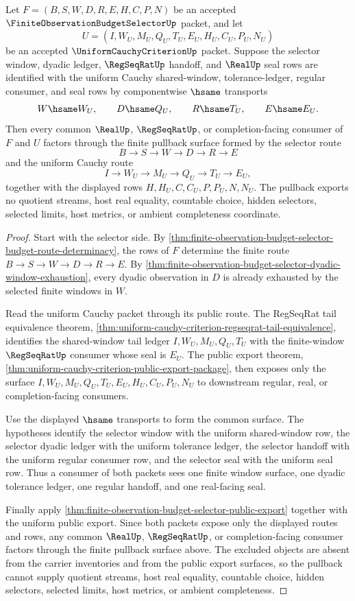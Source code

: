 \begin{theorem}
\label{thm:finite-observation-budget-selector-uniform-cauchycriterion-pullback}
Let $F=(B,S,W,D,R,E,H,C,P,N)$ be an accepted $\FiniteObservationBudgetSelectorUp$ packet, and let
$$
U=(I,W_U,M_U,Q_U,T_U,E_U,H_U,C_U,P_U,N_U)
$$
be an accepted $\UniformCauchyCriterionUp$ packet. Suppose the selector window, dyadic ledger, $\RegSeqRatUp$ handoff, and $\RealUp$ seal rows are identified with the uniform Cauchy shared-window, tolerance-ledger, regular consumer, and seal rows by componentwise $\hsame$ transports
$$
W \hsame W_U,\qquad
D \hsame Q_U,\qquad
R \hsame T_U,\qquad
E \hsame E_U.
$$
Then every common $\RealUp$, $\RegSeqRatUp$, or completion-facing consumer of $F$ and $U$ factors through the finite pullback surface formed by the selector route
$$
B \to S \to W \to D \to R \to E
$$
and the uniform Cauchy route
$$
I \to W_U \to M_U \to Q_U \to T_U \to E_U,
$$
together with the displayed rows $H,H_U,C,C_U,P,P_U,N,N_U$. The pullback exports no quotient streams, host real equality, countable choice, hidden selectors, selected limits, host metrics, or ambient completeness coordinate.
\end{theorem}
\begin{proof}
Start with the selector side. By \autoref{thm:finite-observation-budget-selector-budget-route-determinacy}, the rows of $F$ determine the finite route $B \to S \to W \to D \to R \to E$. By \autoref{thm:finite-observation-budget-selector-dyadic-window-exhaustion}, every dyadic observation in $D$ is already exhausted by the selected finite windows in $W$.

Read the uniform Cauchy packet through its public route. The RegSeqRat tail equivalence theorem, \autoref{thm:uniform-cauchy-criterion-regseqrat-tail-equivalence}, identifies the shared-window tail ledger $I,W_U,M_U,Q_U,T_U$ with the finite-window $\RegSeqRatUp$ consumer whose seal is $E_U$. The public export theorem, \autoref{thm:uniform-cauchy-criterion-public-export-package}, then exposes only the surface $I,W_U,M_U,Q_U,T_U,E_U,H_U,C_U,P_U,N_U$ to downstream regular, real, or completion-facing consumers.

Use the displayed $\hsame$ transports to form the common surface. The hypotheses identify the selector window with the uniform shared-window row, the selector dyadic ledger with the uniform tolerance ledger, the selector handoff with the uniform regular consumer row, and the selector seal with the uniform seal row. Thus a consumer of both packets sees one finite window surface, one dyadic tolerance ledger, one regular handoff, and one real-facing seal.

Finally apply \autoref{thm:finite-observation-budget-selector-public-export} together with the uniform public export. Since both packets expose only the displayed routes and rows, any common $\RealUp$, $\RegSeqRatUp$, or completion-facing consumer factors through the finite pullback surface above. The excluded objects are absent from the carrier inventories and from the public export surfaces, so the pullback cannot supply quotient streams, host real equality, countable choice, hidden selectors, selected limits, host metrics, or ambient completeness.
\end{proof}
